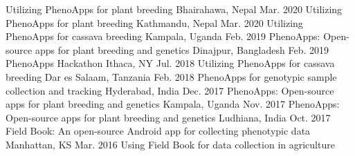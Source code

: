 
\begin{cvworkshops}

  \cvworkshop
    {Utilizing PhenoApps for plant breeding} %
    {Bhairahawa, Nepal} %
    {Mar. 2020} %
  \cvworkshop
    {Utilizing PhenoApps for plant breeding} %
    {Kathmandu, Nepal} %
    {Mar. 2020} %
  \cvworkshop
    {Utilizing PhenoApps for cassava breeding} %
    {Kampala, Uganda} %
    {Feb. 2019} %
  \cvworkshop
    {PhenoApps: Open-source apps for plant breeding and genetics} %
    {Dinajpur, Bangladesh} %
    {Feb. 2019} %
  \cvworkshop
    {PhenoApps Hackathon} %
    {Ithaca, NY} %
    {Jul. 2018} %
  \cvworkshop
    {Utilizing PhenoApps for cassava breeding} %
    {Dar es Salaam, Tanzania} %
    {Feb. 2018} %
  \cvworkshop
    {PhenoApps for genotypic sample collection and tracking} %
    {Hyderabad, India} %
    {Dec. 2017} %
  \cvworkshop
    {PhenoApps: Open-source apps for plant breeding and genetics} %
    {Kampala, Uganda} %
    {Nov. 2017} %
  \cvworkshop
    {PhenoApps: Open-source apps for plant breeding and genetics} %
    {Ludhiana, India} %
    {Oct. 2017} %
  \cvworkshop
    {Field Book: An open-source Android app for collecting phenotypic data} %
    {Manhattan, KS} %
    {Mar. 2016} %
  \cvworkshop
    {Using Field Book for data collection in agriculture} %

\end{cvworkshops}
